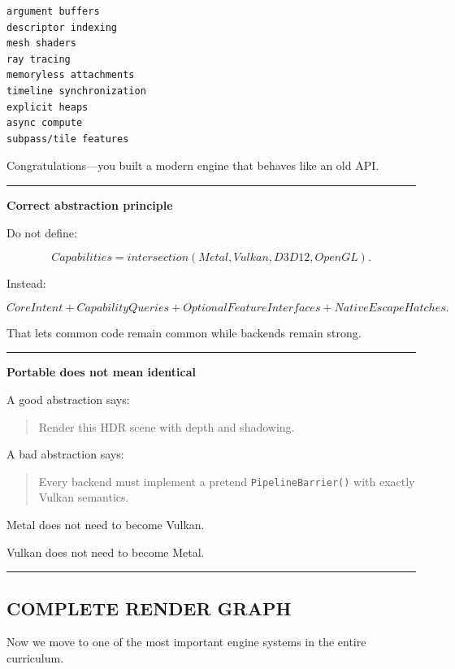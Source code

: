 \begin{verbatim}
argument buffers
descriptor indexing
mesh shaders
ray tracing
memoryless attachments
timeline synchronization
explicit heaps
async compute
subpass/tile features
\end{verbatim}

Congratulations---you built a modern engine that behaves like an old API.

\begin{center}\rule{0.5\linewidth}{0.5pt}\end{center}

\textbf{Correct abstraction principle}

Do not define:

\[
\boxed{
Capabilities=
intersection(
Metal,
Vulkan,
D3D12,
OpenGL).
}
\]

Instead:

\[
\boxed{
CoreIntent
+
CapabilityQueries
+
OptionalFeatureInterfaces
+
NativeEscapeHatches.
}
\]

That lets common code remain common while backends remain strong.

\begin{center}\rule{0.5\linewidth}{0.5pt}\end{center}

\textbf{Portable does not mean identical}

A good abstraction says:

\begin{quote}
Render this HDR scene with depth and shadowing.
\end{quote}

A bad abstraction says:

\begin{quote}
Every backend must implement a pretend \texttt{PipelineBarrier()} with exactly Vulkan semantics.
\end{quote}

Metal does not need to become Vulkan.

Vulkan does not need to become Metal.

\begin{center}\rule{0.5\linewidth}{0.5pt}\end{center}

\subsection{COMPLETE RENDER GRAPH}\label{06-engine-ii-ch043-complete-render-graph}

Now we move to one of the most important engine systems in the entire curriculum.

